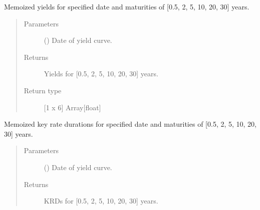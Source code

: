 \documentclass[letterpaper,10pt,english]{report}
\begin{document}
\begin{fulllineitems}
\begin{fulllineitems}
\end{fulllineitems}


\begin{fulllineitems}
\label{\detokenize{index:lgimapy.models.TreasuryCurve.get_KRD_yields}}
Memoized yields for specified date and
maturities of {[}0.5, 2, 5, 10, 20, 30{]} years.
\begin{quote}\begin{description}
\item[{Parameters}] \leavevmode
{} () \textendash{} Date of yield curve.

\item[{Returns}] \leavevmode
{} \textendash{} Yields for {[}0.5, 2, 5, 10, 20, 30{]} years.

\item[{Return type}] \leavevmode
{[}1 x 6{]} Array{[}float{]}

\end{description}\end{quote}

\end{fulllineitems}


\begin{fulllineitems}
\label{\detokenize{index:lgimapy.models.TreasuryCurve.get_KRDs_and_coupons}}
Memoized key rate durations for specified date and
maturities of {[}0.5, 2, 5, 10, 20, 30{]} years.
\begin{quote}\begin{description}
\item[{Parameters}] \leavevmode
{} () \textendash{} Date of yield curve.

\item[{Returns}] \leavevmode
{} \textendash{} KRDs for {[}0.5, 2, 5, 10, 20, 30{]} years.


\end{description}
\end{quote}
\end{fulllineitems}
\end{fulllineitems}
\end{document}
